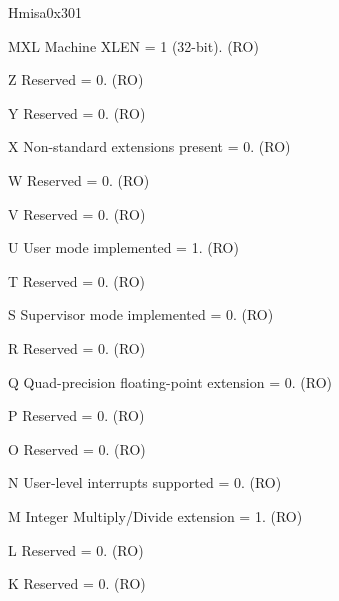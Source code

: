\begin{register}{H}{misa}{0x301}\label{regdesc:MISA}
%
%
%
%
%
%
%
%
%
%
%
%
%
%
%
%
%
%
%
%
%
%
%
%
%
%
%
%
\regnewline%
\begin{regdesc}\begin{reglist}
\label{fielddesc:MISAMXL}\item [MXL] Machine XLEN = 1 (32-bit). (RO)
\label{fielddesc:MISAZ}\item [Z] Reserved = 0. (RO)
\label{fielddesc:MISAY}\item [Y] Reserved = 0. (RO)
\label{fielddesc:MISAX}\item [X] Non-standard extensions present = 0. (RO)
\label{fielddesc:MISAW}\item [W] Reserved = 0. (RO)
\label{fielddesc:MISAV}\item [V] Reserved = 0. (RO)
\label{fielddesc:MISAU}\item [U] User mode implemented = 1. (RO)
\label{fielddesc:MISAT}\item [T] Reserved = 0. (RO)
\label{fielddesc:MISAS}\item [S] Supervisor mode implemented = 0. (RO)
\label{fielddesc:MISAR}\item [R] Reserved = 0. (RO)
\label{fielddesc:MISAQ}\item [Q] Quad-precision floating-point extension = 0. (RO)
\label{fielddesc:MISAP}\item [P] Reserved = 0. (RO)
\label{fielddesc:MISAO}\item [O] Reserved = 0. (RO)
\label{fielddesc:MISAN}\item [N] User-level interrupts supported = 0. (RO)
\label{fielddesc:MISAM}\item [M] Integer Multiply/Divide extension = 1. (RO)
\label{fielddesc:MISAL}\item [L] Reserved = 0. (RO)
\label{fielddesc:MISAK}\item [K] Reserved = 0. (RO)

\end{reglist}
\end{regdesc}
\end{register}
